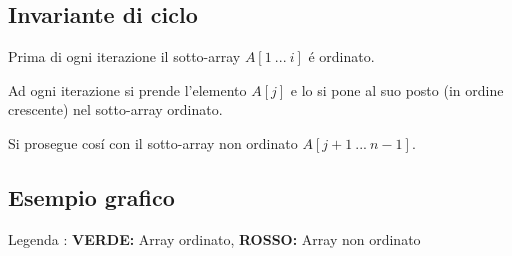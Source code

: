 \documentclass[a4paper, 9pt]{article}
\begin{document}
    \subsection{Invariante di ciclo}
        Prima di ogni iterazione il sotto-array $A[1\ ...\ i]$ \'e ordinato.
        
        Ad ogni iterazione si prende l'elemento $A[j]$ e lo si pone al suo posto (in ordine crescente) nel sotto-array ordinato.
        
        Si prosegue cos\'{i} con il sotto-array non ordinato $A[j+1\ ...\ n-1]$.
    
    \newpage
    \subsection{Esempio grafico}
        Legenda : {\color{green!70} \textbf{VERDE:} Array ordinato}, {\color{red!70} \textbf{ROSSO:} Array non ordinato}
\end{document}
